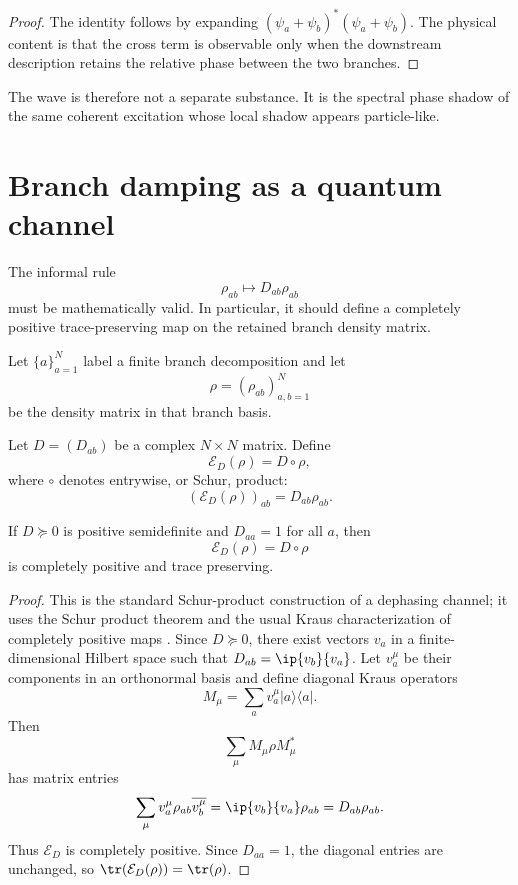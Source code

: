 \documentclass[11pt]{article}
\newcommand{\calE}{\mathcal E}
\begin{document}
\begin{proof}
The identity follows by expanding \((\psi_a+\psi_b)^\ast(\psi_a+\psi_b)\). The physical
content is that the cross term is observable only when the downstream description retains
the relative phase between the two branches.
\end{proof}

The wave is therefore not a separate substance. It is the spectral phase shadow of the same
coherent excitation whose local shadow appears particle-like.

\section{Branch damping as a quantum channel}

The informal rule
\[
  \rho_{ab}\mapsto D_{ab}\rho_{ab}
\]
must be mathematically valid. In particular, it should define a completely positive
trace-preserving map on the retained branch density matrix.

Let \(\{a\}_{a=1}^N\) label a finite branch decomposition and let
\[
  \rho=(\rho_{ab})_{a,b=1}^N
\]
be the density matrix in that branch basis.

\begin{definition}
Let \(D=(D_{ab})\) be a complex \(N\times N\) matrix. Define
\[
  \calE_D(\rho)=D\circ \rho,
\]
where \(\circ\) denotes entrywise, or Schur, product:
\[
  (\calE_D(\rho))_{ab}=D_{ab}\rho_{ab}.
\]
\end{definition}

\begin{theorem}
\label{thm:schur-channel}
If \(D\succeq0\) is positive semidefinite and \(D_{aa}=1\) for all \(a\), then
\[
  \calE_D(\rho)=D\circ\rho
\]
is completely positive and trace preserving.
\end{theorem}

\begin{proof}
This is the standard Schur-product construction of a dephasing channel; it uses the Schur
product theorem and the usual Kraus characterization of completely positive maps
\cite{HornJohnson,Paulsen,NielsenChuang}. Since \(D\succeq0\), there exist vectors
\(v_a\) in a finite-dimensional Hilbert space such that \(D_{ab}=\ip{v_b}{v_a}\). Let
\(v_a^\mu\) be their components in an orthonormal basis
and define diagonal Kraus operators
\[
  M_\mu=\sum_a v_a^\mu |a\rangle\langle a|.
\]
Then
\[
  \sum_\mu M_\mu \rho M_\mu^\ast
\]
has matrix entries
\[
  \sum_\mu v_a^\mu \rho_{ab}\overline{v_b^\mu}
  =
  \ip{v_b}{v_a}\rho_{ab}
  =
  D_{ab}\rho_{ab}.
\]
Thus \(\calE_D\) is completely positive. Since \(D_{aa}=1\), the diagonal entries are unchanged,
so \(\tr(\calE_D(\rho))=\tr(\rho)\).
\end{proof}
\end{document}
